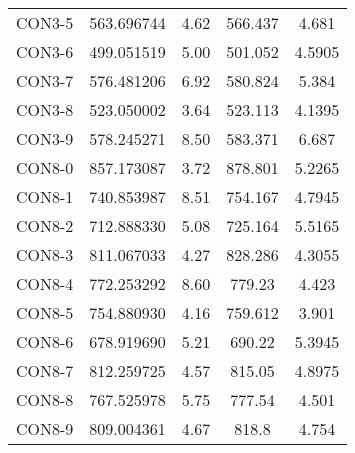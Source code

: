 \begin{table}[ht]
\begin{tabular}{c c c c c}
CON3-5 & 563.696744 & 4.62 & 566.437 & 4.681 \\
CON3-6 & 499.051519 & 5.00 & 501.052 & 4.5905 \\
CON3-7 & 576.481206 & 6.92 & 580.824 & 5.384 \\
CON3-8 & 523.050002 & 3.64 & 523.113 & 4.1395 \\
CON3-9 & 578.245271 & 8.50 & 583.371 & 6.687 \\
CON8-0 & 857.173087 & 3.72 & 878.801 & 5.2265 \\
CON8-1 & 740.853987 & 8.51 & 754.167 & 4.7945 \\
CON8-2 & 712.888330 & 5.08 & 725.164 & 5.5165 \\
CON8-3 & 811.067033 & 4.27 & 828.286 & 4.3055 \\
CON8-4 & 772.253292 & 8.60 & 779.23 & 4.423 \\
CON8-5 & 754.880930 & 4.16 & 759.612 & 3.901 \\
CON8-6 & 678.919690 & 5.21 & 690.22 & 5.3945 \\
CON8-7 & 812.259725 & 4.57 & 815.05 & 4.8975 \\
CON8-8 & 767.525978 & 5.75 & 777.54 & 4.501 \\
CON8-9 & 809.004361 & 4.67 & 818.8 & 4.754 \\
[1ex]\hline
\end{tabular}
\label{table:nonlin}
\end{table} \clearpage
